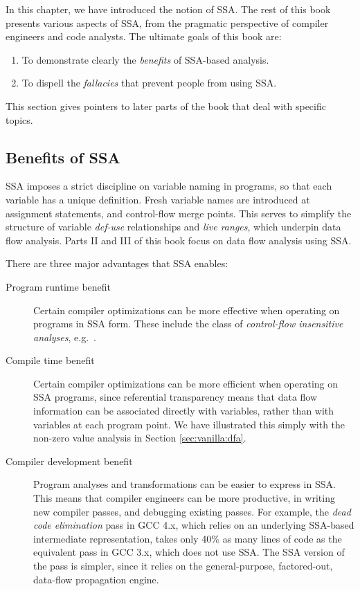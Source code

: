 In this chapter, we have introduced the notion of SSA.
The rest of this book presents various aspects of SSA,
from the pragmatic perspective of compiler engineers and
code analysts. The ultimate goals of this book are:
\begin{enumerate}
\item To demonstrate clearly the \emph{benefits} of SSA-based analysis.
\item To dispell the \emph{fallacies} that prevent people from using SSA.
\end{enumerate}
This section gives pointers to later parts of the book that deal with
specific topics.


\subsection{Benefits of SSA}


SSA imposes a strict discipline on variable naming in programs,
so that each variable has a unique definition.
Fresh variable names are introduced at assignment statements,
and control-flow merge points.
This serves to simplify the structure of variable \emph{def-use}
relationships and \emph{live ranges},
which underpin data flow analysis. Parts II and III of this book focus
on data flow analysis using SSA.

There are three major advantages that SSA enables:
\begin{description}
\item[Program runtime benefit]
Certain compiler optimizations can be more effective
when operating on programs in SSA form. These include the
class of \textit{control-flow insensitive analyses}, e.g.\
\cite{hasti98using}.
\item[Compile time benefit]
Certain compiler optimizations can be more efficient
when operating on SSA programs, since
referential transparency means that data flow information
can be associated directly with variables, rather than with variables
at each program point. We have illustrated this simply with the
non-zero value analysis in Section \ref{sec:vanilla:dfa}.
\item[Compiler development benefit]
Program analyses and transformations can be easier
to express in SSA. This means that compiler engineers
can be more productive, in writing new compiler passes,
and debugging existing passes.
For example, the \textit{dead code elimination} pass
in GCC 4.x, which relies on an underlying SSA-based intermediate
representation, takes only 40\% as many lines of code
as the equivalent pass in GCC 3.x, which does not use SSA.
The SSA version of the pass is simpler, since it
relies on the general-purpose, factored-out, data-flow propagation
engine.
\end{description}


